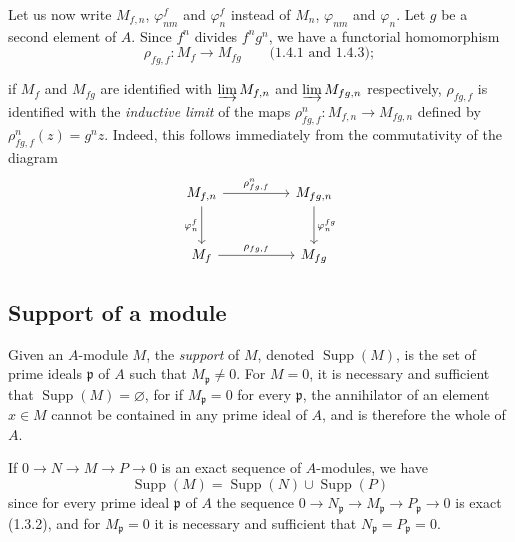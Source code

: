 \begin{env}[1.6.2]
\label{0.1.6.2}
Let us now write $M_{f,n}$, $\varphi_{nm}^f$ and $\varphi_n^f$ instead of
$M_n$, $\varphi_{nm}$ and $\varphi_n$. Let $g$ be a second element of $A$. Since
$f^n$ divides $f^ng^n$, we have a functorial homomorphism
\[
  \rho_{fg,f}:M_f\longrightarrow M_{fg}\qquad\text{(1.4.1 and 1.4.3)};
\]


if $M_f$ and $M_{fg}$ are identified with $\varinjlim M_{f,n}$ and
$\varinjlim M_{fg,n}$ respectively, $\rho_{fg,f}$ is identified with the
\emph{inductive limit} of the maps
$\rho_{fg,f}^n:M_{f,n}\to M_{fg,n}$ defined by
$\rho_{fg,f}^n(z)=g^nz$. Indeed, this follows immediately from the
commutativity of the diagram
\[
\begin{tikzcd}[column sep=huge,row sep=large]
M_{f,n} \arrow[r,"\rho_{fg,f}^n"] \arrow[d,"\varphi_n^f"']
  & M_{fg,n} \arrow[d,"\varphi_n^{fg}"] \\
M_f \arrow[r,"\rho_{fg,f}"]
  & M_{fg}
\end{tikzcd}
\]
\end{env}

\subsection{Support of a module}
\label{subsection:0.1.7}

\begin{env}[1.7.1]
\label{0.1.7.1}
Given an $A$-module $M$, the \emph{support} of $M$, denoted
$\operatorname{Supp}(M)$, is the set of prime ideals $\mathfrak p$ of $A$
such that $M_{\mathfrak p}\neq0$. For $M=0$, it is necessary and sufficient that
$\operatorname{Supp}(M)=\varnothing$, for if $M_{\mathfrak p}=0$ for every
$\mathfrak p$, the annihilator of an element $x\in M$ cannot be contained in
any prime ideal of $A$, and is therefore the whole of $A$.
\end{env}

\begin{env}[1.7.2]
\label{0.1.7.2}
If $0\to N\to M\to P\to0$ is an exact sequence of $A$-modules, we have
\[
  \operatorname{Supp}(M)=\operatorname{Supp}(N)\cup\operatorname{Supp}(P)
\]
since for every prime ideal $\mathfrak p$ of $A$ the sequence
$0\to N_{\mathfrak p}\to M_{\mathfrak p}\to P_{\mathfrak p}\to0$ is exact
(1.3.2), and for $M_{\mathfrak p}=0$ it is necessary and sufficient that
$N_{\mathfrak p}=P_{\mathfrak p}=0$.
\end{env}

